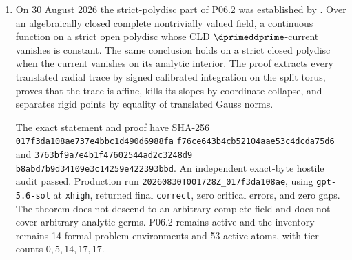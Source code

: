 \begin{enumerate}
  The exact statement and proof have SHA-256
  \texttt{e1daa4b3e3efd64fcc8f0ce05b9c1d5d}
  \allowbreak\texttt{6cb69b28686b939b48535fc56b0ccc07} and
  \texttt{a6c24d1686c726dc72aebe55a1e83eb8}
  \allowbreak\texttt{d4fe1ed4025d4a8d7166da59123ce30e}.
  Two source-aware hostile audits passed.  Production run
  \texttt{20260829T235341Z\_e1daa4b3e3ef}, using
  \texttt{gpt-5.6-sol} at \texttt{xhigh}, returned final
  \texttt{correct}, zero critical errors, and zero gaps.  The theorem
  settles finite constant-group quotients of all previously verified
  separated strict affinoid source scopes, but supplies no general quotient
  uniformization.  P06.1 remains active and the inventory remains 14 formal
  problem environments and 53 active atoms, with tier counts
  \(0,5,14,17,17\).
\item On 30 August 2026 the strict-polydisc part of P06.2 was established by
  .  Over an algebraically
  closed complete nontrivially valued field, a continuous function on a
  strict open polydisc whose CLD \(\dprimeddprime\)-current vanishes is
  constant.  The same conclusion holds on a strict closed polydisc when the
  current vanishes on its analytic interior.  The proof extracts every
  translated radial trace by signed calibrated integration on the split
  torus, proves that the trace is affine, kills its slopes by coordinate
  collapse, and separates rigid points by equality of translated Gauss
  norms.

  The exact statement and proof have SHA-256
  \texttt{017f3da108ae737e4bbc1d490d6988fa}
  \allowbreak\texttt{f76ce643b4cb52104aae53c4dcda75d6} and
  \texttt{3763bf9a7e4b1f47602544ad2c3248d9}
  \allowbreak\texttt{b8abd7b9d34109e3c14259e422393bbd}.
  An independent exact-byte hostile audit passed.  Production run
  \texttt{20260830T001728Z\_017f3da108ae}, using
  \texttt{gpt-5.6-sol} at \texttt{xhigh}, returned final
  \texttt{correct}, zero critical errors, and zero gaps.  The theorem does
  not descend to an arbitrary complete field and does not cover arbitrary
  analytic germs.  P06.2 remains active and the inventory remains 14 formal
  problem environments and 53 active atoms, with tier counts
  \(0,5,14,17,17\).
\end{enumerate}
